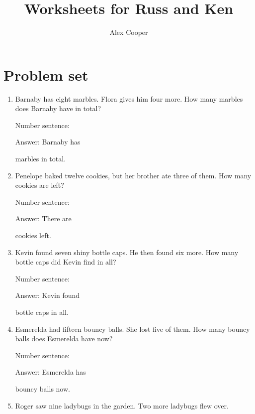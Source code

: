 \documentclass{tufte-book}
\title{Worksheets for Russ and Ken}
\author[Alex Cooper]{Alex Cooper}
\begin{document}
\frontmatter

\maketitle


\clearpage\section{Problem set }

\begin{enumerate}

\item
  Barnaby has eight marbles. Flora gives him four more. How many marbles
  does Barnaby have in total?\medskip\par
  Number sentence:
  \dotfill\medskip\par
  Answer: Barnaby has
  \dotfill\medskip\par\mbox{}\dotfill\medskip\par\mbox{}\dotfill\bigskip
  marbles in total.
\item
  Penelope baked twelve cookies, but her brother ate three of them. How
  many cookies are left?\medskip\par
  Number sentence:
  \dotfill\medskip\par
  Answer: There are
  \dotfill\medskip\par\mbox{}\dotfill\medskip\par\mbox{}\dotfill\bigskip
  cookies left.
\item
  Kevin found seven shiny bottle caps. He then found six more. How many
  bottle caps did Kevin find in all?\medskip\par
  Number sentence:
  \dotfill\medskip\par
  Answer: Kevin found
  \dotfill\medskip\par\mbox{}\dotfill\medskip\par\mbox{}\dotfill\bigskip
  bottle caps in all.
\item
  Esmerelda had fifteen bouncy balls. She lost five of them. How many
  bouncy balls does Esmerelda have now?\medskip\par
  Number sentence:
  \dotfill\medskip\par
  Answer: Esmerelda has
  \dotfill\medskip\par\mbox{}\dotfill\medskip\par\mbox{}\dotfill\bigskip
  bouncy balls now.
\item
  Roger saw nine ladybugs in the garden. Two more ladybugs flew over.

\end{enumerate}
\end{document}
